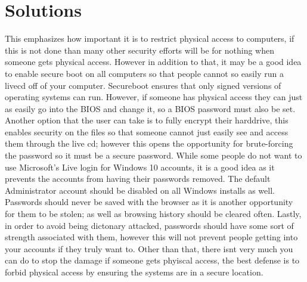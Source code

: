 \documentclass[a4paper, 11pt]{article}
\begin{document}
\section*{Solutions}
This emphasizes how important it is to restrict physical access to computers, if this is not done than many other security efforts will be for nothing when someone gets physical access.  However in addition to that, it may be a good idea to enable secure boot on all computers so that people cannot so easily run a livecd off of your computer.  Secureboot ensures that only signed versions of operating systems can run.  However, if someone has physical access they can just as easily go into the BIOS and change it, so a BIOS password must also be set.  Another option that the user can take is to fully encrypt their harddrive, this enables security on the files so that someone cannot just easily see and access them through the live cd; however this opens the opportunity for brute-forcing the password so it must be a secure password.  While some people do not want to use Microsoft's Live login for Windows 10 accounts, it is a good idea as it prevents the accounts from having their passwords removed.  The default Administrator account should be disabled on all Windows installs as well.  Passwords should never be saved with the browser as it is another opportunity for them to be stolen; as well as browsing history should be cleared often.  Lastly, in order to avoid being dictonary attacked, passwords should have some sort of strength associated with them, however this will not prevent people getting into your accounts if they truly want to.  Other than that, there isnt very much you can do to stop the damage if someone gets phyiscal access, the best defense is to forbid physical access by ensuring the systems are in a secure location.
\end{document}
